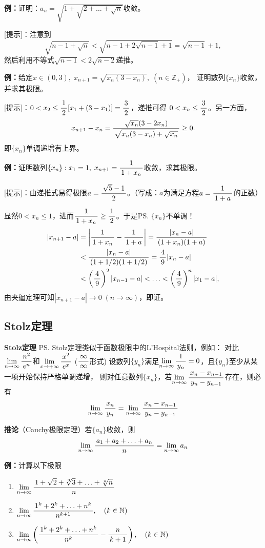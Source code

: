 {\bf 例：}证明：$a_n=\sqrt{1+\sqrt{2+\ldots+\sqrt{n}}}$收敛。

[提示]：注意到
$$\sqrt{n-1+\sqrt n}<\sqrt{n-1+2\sqrt{n-1}+1}=\sqrt{n-1}+1,$$
然后利用不等式$\sqrt{n-1}<2\sqrt{n-2}$递推。

{\bf 例：}给定$x\in(0,3),\; x_{n+1}=\sqrt{x_n(3-x_n)},\;(n\in\mathbb{Z}_+)$，
证明数列$\{x_n\}$收敛，并求其极限。

[提示]：$0<x_2\leq\df12[x_1+(3-x_1)]=\df32$，递推可得
$0<x_n\leq\df32$。另一方面，
$$x_{n+1}-x_n=\df{\sqrt{x_n}(3-2x_n)}{\sqrt{x_n(3-x_n)}+\sqrt{x_n}}\geq 0.$$
即$\{x_n\}$单调递增有上界。

{\bf 例：}证明数列$\{x_n\}:x_1=1,\;x_{n+1}=\df1{1+x_n}$收敛，求其极限。

[提示]：由递推式易得极限$a=\df{\sqrt5-1}2$。（写成：$a$为满足方程$a=\df1{1+a}$的正数）

显然$0<x_n\leq1$，进而$\df1{1+x_n}\geq\df12$。于是\ps{$\{x_n\}$不单调！}
\begin{align}
	|x_{n+1}-a|&=\left|\df1{1+x_n}-\df1{1+a}\right|=\df{|x_n-a|}{(1+x_n)(1+a)}\notag\\
	&<\df{|x_n-a|}{(1+1/2)(1+1/2)}=\df49|x_n-a|\notag\\
	&<\left(\df49\right)^2|x_{n-1}-a|<\ldots<\left(\df49\right)^{n}|x_1-a|,\notag
\end{align}
由夹逼定理可知$|x_{n+1}-a|\to0\;(n\to\infty)$，即证。

\subsection{Stolz定理}

{\b{\bf Stolz定理}
\ps{Stolz定理类似于函数极限中的L'Hospital法则，例如：
对比$\limn\df{n^2}{e^n}$和$\limx{+\infty}\df{x^2}{e^x}$}
($\df{\infty}{\infty}$形式) 设数列$\{y_n\}$满足$\limn\df
1{y_n}=0$，且$\{y_n\}$至少从某一项开始保持严格单调递增，
则对任意数列$\{x_n\}$，若$\limn\df{x_n-x_{n-1}}{y_n-y_{n-1}}$存在，则必有
$$\limn\df{x_n}{y_n}=\limn\df{x_n-x_{n-1}}{y_n-y_{n-1}}$$


{\bf 推论}（Cauchy极限定理）若$\{a_n\}$收敛，则
$$\limn\df{a_1+a_2+\ldots+a_n}n=\limn a_n$$}

{\bf 例：}计算以下极限
\begin{enumerate}[(1)]
  \setlength{\itemindent}{1cm}
  \item $\limn\df{1+\sqrt 2+\sqrt[3]{3}+\ldots+\sqrt[n]{n}}{n}$ 
  \item $\limn\df{1^k+2^k+\ldots+n^k}{n^{k+1}},\quad(k\in\mathbb{N})$ 
  \item $\limn\left(\df{1^k+2^k+\ldots+n^k}{n^{k}}-\df
  n{k+1}\right),\quad(k\in\mathbb{N})$
\end{enumerate}
  
